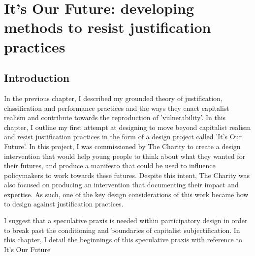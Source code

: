 \chapter{It's Our Future: developing methods to resist justification practices}
\label{}

\section{Introduction}
\label{}

In the previous chapter, I described my grounded theory of justification, classification and performance practices and the ways they enact capitalist realism and contribute towards the reproduction of 'vulnerability'. In this chapter, I outline my first attempt at designing to move beyond capitalist realism and resist justification practices in the form of a design project called 'It's Our Future'. In this project, I was commissioned by The Charity to create a design intervention that would help young people to think about what they wanted for their futures, and produce a manifesto that could be used to influence policymakers to work towards these futures. Despite this intent, The Charity was also focused on producing an intervention that documenting their impact and expertise. As such, one of the key design considerations of this work became how to design against justification practices. 



I suggest that a speculative praxis is needed within participatory design in order to break past the conditioning and boundaries of capitalist subjectification. In this chapter, I detail the beginnings of this speculative praxis with reference to It’s Our Future

